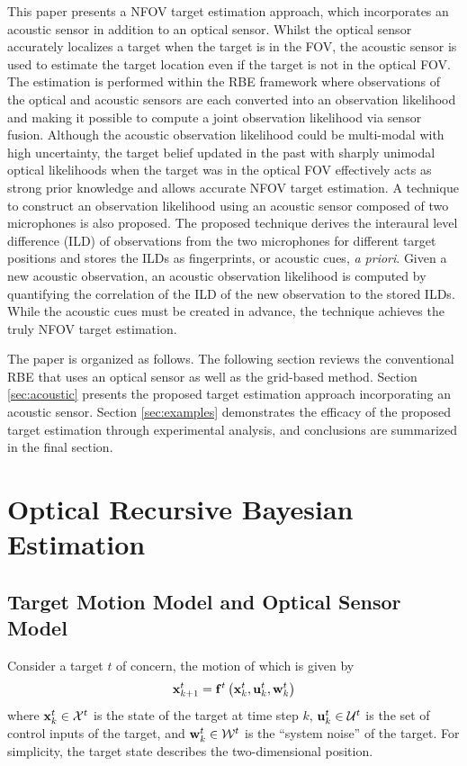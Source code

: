 This paper presents a NFOV target estimation approach, which incorporates an acoustic sensor in addition to an optical sensor.  Whilst the optical sensor accurately localizes a target when the target is in the FOV, the acoustic sensor is used to estimate the target location even if the target is not in the optical FOV.  The estimation is performed within the RBE framework where observations of the optical and acoustic sensors are each converted into an observation likelihood and making it possible to compute a joint observation likelihood via sensor fusion.  Although the acoustic observation likelihood could be multi-modal with high uncertainty, the target belief updated in the past with sharply unimodal optical likelihoods when the target was in the optical FOV effectively acts as strong prior knowledge and allows accurate NFOV target estimation.  A technique to construct an observation likelihood using an acoustic sensor composed of two microphones is also proposed.  The proposed technique derives the interaural level difference (ILD) of observations from the two microphones for different target positions and stores the ILDs as fingerprints, or acoustic cues, \textit{a priori}.  Given a new acoustic observation, an acoustic observation likelihood is computed by quantifying the correlation of the ILD of the new observation to the stored ILDs.  While the acoustic cues must be created in advance, the technique achieves the truly NFOV target estimation.   

The paper is organized as follows. The following section reviews the conventional RBE that uses an optical sensor as well as the grid-based method. Section \ref{sec:acoustic} presents the proposed target estimation approach incorporating an acoustic sensor. Section \ref{sec:examples} demonstrates the efficacy of the proposed target estimation through experimental analysis, and conclusions are summarized in the final section.

\section{Optical Recursive Bayesian Estimation}
\label{sec:Bayes}
\subsection{Target Motion Model and Optical Sensor Model}
Consider a target $t$ of concern, the motion of which is given by
\begin{equation}\label{eq:target_model}
\mathbf{x}_{k+1}^{t} = \mathbf{f}^{t} \left ( \mathbf{x}_{k}^{t}, \mathbf{u}_{k}^{t}, \mathbf{w}_{k}^{t} \right )
\end{equation}
where $\mathbf{x}_{k}^{t} \in \mathcal{X}^t$ is the state of the target at time step $k$, $\mathbf{u}_{k}^{t} \in \mathcal{U}^t$ is the set of control inputs of the target, and $\mathbf{w}_{k}^{t} \in \mathcal{W}^t$ is the ``system noise'' of the target. For simplicity, the target state describes the two-dimensional position.



